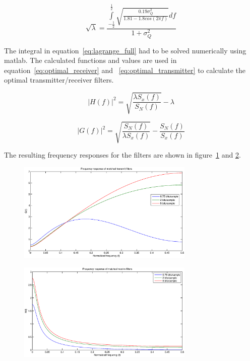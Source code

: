 	\begin{equation}
		\sqrt{\lambda}=\frac{\int\limits_{-\frac{1}{2}}^{\frac{1}{2}}\sqrt{\frac{0.19\sigma^2_Q}{1.81-1.8cos(2\pi f)}}df}{1+\sigma^2_Q}
		\label{eq:lagrange_full}
	\end{equation}
	
	The integral in equation~\ref{eq:lagrange_full} had to be solved numerically using matlab. The calculated functions and values are used in equation~\ref{eq:optimal_receiver} and ~\ref{eq:optimal_transmitter} to calculate the optimal transmitter/receiver filters.
	
	\begin{equation}
		|H(f)|^2=\sqrt{\frac{\lambda S_x(f)}{S_N(f)}}-\lambda
		\label{eq:optimal_receiver}
	\end{equation}
	
	\begin{equation}
		|G(f)|^2=\sqrt{\frac{S_N(f)}{\lambda S_x(f)}}-\frac{S_N(f)}{S_x(f)}
		\label{eq:optimal_transmitter}
	\end{equation}
	
	The resulting frequency responses for the filters are shown in figure~\ref{fig:freq_opt_G} and \ref{fig:freq_opt_H}.
	
	\begin{figure}[H]
	  \centering
	  \includegraphics[width=0.75\textwidth]{img/Oppgave2a_freq_G}
	  \label{fig:freq_opt_G}
	\end{figure}
	
	\begin{figure}[H]
	  \centering
	  \includegraphics[width=0.75\textwidth]{img/Oppgave2a_freq_H}
	  \label{fig:freq_opt_H}
	\end{figure}
	
